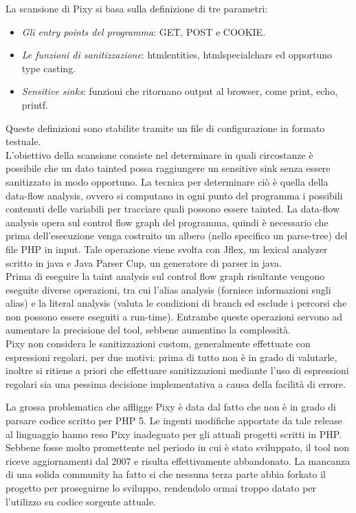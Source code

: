 La scansione di Pixy si basa sulla definizione di tre parametri:
\begin{itemize}
\item \emph{Gli entry points del programma}: GET, POST e COOKIE.
\item \emph{Le funzioni di sanitizzazione}: htmlentities, htmlspecialchars ed opportuno type casting.
\item \emph{Sensitive sinks}: funzioni che ritornano output al browser, come print, echo, printf.
\end{itemize}
Queste definizioni sono stabilite tramite un file di configurazione in formato testuale.\\
L'obiettivo della scansione consiste nel determinare in quali circostanze è possibile che un dato tainted possa raggiungere un sensitive sink senza essere sanitizzato in modo opportuno. La tecnica per determinare ciò è quella della data-flow analysis, ovvero si computano in ogni punto del programma i possibili contenuti delle variabili per tracciare quali possono essere tainted. La data-flow analysis opera sul control flow graph del programma, quindi è necessario che prima dell'esecuzione venga costruito un albero (nello specifico un parse-tree) del file PHP in input. Tale operazione viene svolta con Jflex\cite{jflex}, un lexical analyzer scritto in java e Java Parser Cup\cite{jpc}, un generatore di parser in java.\\
Prima di eseguire la taint analysis sul control flow graph risultante vengono eseguite diverse operazioni, tra cui l'alias analysis (fornisce informazioni sugli alias) e la literal analysis (valuta le condizioni di branch ed esclude i percorsi che non possono essere eseguiti a run-time). Entrambe queste operazioni servono ad aumentare la precisione del tool, sebbene aumentino la complessità.\\
Pixy non considera le sanitizzazioni custom, generalmente effettuate con espressioni regolari, per due motivi: prima di tutto non è in grado di valutarle, inoltre si ritiene a priori che effettuare sanitizzazioni mediante l'uso di espressioni regolari sia una pessima decisione implementativa a causa della facilità di errore.

La grossa problematica che affligge Pixy è data dal fatto che non è in grado di parsare codice scritto per PHP 5. Le ingenti modifiche apportate da tale release al linguaggio hanno reso Pixy inadeguato per gli attuali progetti scritti in PHP.\\
Sebbene fosse molto promettente nel periodo in cui è stato sviluppato, il tool non riceve aggiornamenti dal 2007 e risulta effettivamente abbandonato. La mancanza di una solida community ha fatto si che nessuna terza parte abbia forkato il progetto per proseguirne lo sviluppo, rendendolo ormai troppo datato per l'utilizzo su codice sorgente attuale.

